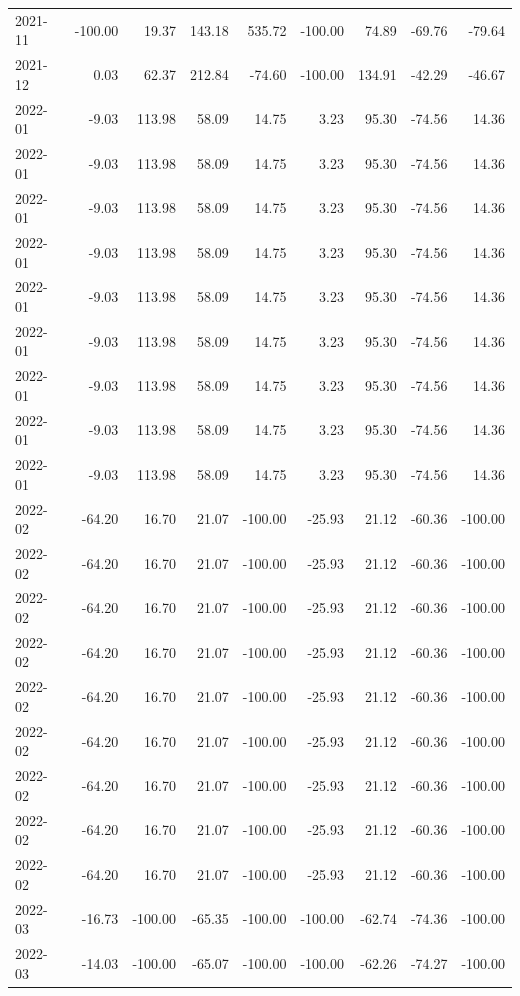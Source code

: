 \begin{table}[ht]
\begin{tabular}{lrrrrrrrr}
  2021-11 & -100.00 & 19.37 & 143.18 & 535.72 & -100.00 & 74.89 & -69.76 & -79.64 \\ 
  2021-12 & 0.03 & 62.37 & 212.84 & -74.60 & -100.00 & 134.91 & -42.29 & -46.67 \\ 
  2022-01 & -9.03 & 113.98 & 58.09 & 14.75 & 3.23 & 95.30 & -74.56 & 14.36 \\ 
  2022-01 & -9.03 & 113.98 & 58.09 & 14.75 & 3.23 & 95.30 & -74.56 & 14.36 \\ 
  2022-01 & -9.03 & 113.98 & 58.09 & 14.75 & 3.23 & 95.30 & -74.56 & 14.36 \\ 
  2022-01 & -9.03 & 113.98 & 58.09 & 14.75 & 3.23 & 95.30 & -74.56 & 14.36 \\ 
  2022-01 & -9.03 & 113.98 & 58.09 & 14.75 & 3.23 & 95.30 & -74.56 & 14.36 \\ 
  2022-01 & -9.03 & 113.98 & 58.09 & 14.75 & 3.23 & 95.30 & -74.56 & 14.36 \\ 
  2022-01 & -9.03 & 113.98 & 58.09 & 14.75 & 3.23 & 95.30 & -74.56 & 14.36 \\ 
  2022-01 & -9.03 & 113.98 & 58.09 & 14.75 & 3.23 & 95.30 & -74.56 & 14.36 \\ 
  2022-01 & -9.03 & 113.98 & 58.09 & 14.75 & 3.23 & 95.30 & -74.56 & 14.36 \\ 
  2022-02 & -64.20 & 16.70 & 21.07 & -100.00 & -25.93 & 21.12 & -60.36 & -100.00 \\ 
  2022-02 & -64.20 & 16.70 & 21.07 & -100.00 & -25.93 & 21.12 & -60.36 & -100.00 \\ 
  2022-02 & -64.20 & 16.70 & 21.07 & -100.00 & -25.93 & 21.12 & -60.36 & -100.00 \\ 
  2022-02 & -64.20 & 16.70 & 21.07 & -100.00 & -25.93 & 21.12 & -60.36 & -100.00 \\ 
  2022-02 & -64.20 & 16.70 & 21.07 & -100.00 & -25.93 & 21.12 & -60.36 & -100.00 \\ 
  2022-02 & -64.20 & 16.70 & 21.07 & -100.00 & -25.93 & 21.12 & -60.36 & -100.00 \\ 
  2022-02 & -64.20 & 16.70 & 21.07 & -100.00 & -25.93 & 21.12 & -60.36 & -100.00 \\ 
  2022-02 & -64.20 & 16.70 & 21.07 & -100.00 & -25.93 & 21.12 & -60.36 & -100.00 \\ 
  2022-02 & -64.20 & 16.70 & 21.07 & -100.00 & -25.93 & 21.12 & -60.36 & -100.00 \\ 
  2022-03 & -16.73 & -100.00 & -65.35 & -100.00 & -100.00 & -62.74 & -74.36 & -100.00 \\ 
  2022-03 & -14.03 & -100.00 & -65.07 & -100.00 & -100.00 & -62.26 & -74.27 & -100.00 \\ 

\end{tabular}
\end{table}
